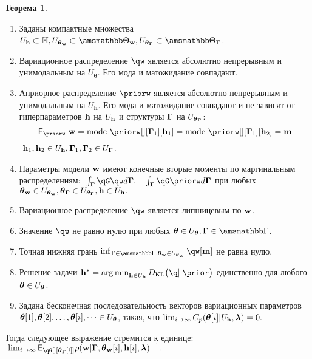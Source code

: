 \documentclass[11pt, a5paper]{dissert}
\theoremstyle{definition}
\newtheorem{theorem}{Теорема}
\DeclareMathOperator*{\argmin}{arg\,min}
\begin{document}
{\begin{theorem}
\begin{enumerate}
\item Заданы компактные множества $\Uh \subset \Hb, \Utetaw \subset \Tetawb, \UtetaG \subset \TetaGb$.

\item Вариационное распределение $\qw$  является абсолютно непрерывным и унимодальным на  $U_{\boldsymbol{\theta}}$.
Его мода и матожидание совпадают.




\item Априорное распределение $\priorw$ является абсолютно непрерывным и унимодальным на  $U_\mathbf{h}$. Его мода и матожидание совпадают и не зависят от гиперпараметров $\mathbf{h}$  на $U_{\mathbf{h}}$ и структуры $\boldsymbol{\Gamma}$ на $U_{\boldsymbol{\theta}_{\boldsymbol{\Gamma}}}$:
\[
\E_{\priorw}~\w = \text{mode}~\priorw[][\G_1][\h_1]=\text{mode}~\priorw[][\G_1][\h_2]=\mathbf{m}
\]
$~\mathbf{h}_1,\mathbf{h}_2 \in U_{\mathbf{h}}, \boldsymbol{\Gamma}_1,\boldsymbol{\Gamma}_2 \in U_{\boldsymbol{\Gamma}}$.


\item Параметры модели $\mathbf{w}$ имеют конечные вторые моменты по маргинальным распределениям:
$
   \int_{\G}\qG\qw d\G, \quad \int_{\G}\qG\priorw d\G
$
при любых $\boldsymbol{\theta}_\mathbf{w} \in U_{\boldsymbol{\theta}_\mathbf{w}}, \boldsymbol{\theta}_{\boldsymbol{\Gamma}} \in U_{\boldsymbol{\theta}_{\boldsymbol{\Gamma}}}, \mathbf{h} \in U_{\mathbf{h}}.$


\item Вариационное распределение $\qw$ является липшицевым по $\mathbf{w}$.

\item Значение $\qw$ не равно нулю при любых $\teta \in \Uteta, \G \in \Gb$.

\item Точная нижняя грань $\inf_{\G \in \Gb, \tetaw \in \Utetaw} \qw[\mathbf{m}]$ не равна нулю.


\item Решение задачи $
\h^{*} = \argmin_{\h \in \Uh} \KL{\q}{\prior}$ единственно для любого $\boldsymbol{\theta} \in U_{\boldsymbol{\theta}}$.



\item Задана бесконечная последовательность векторов вариационных параметров $\boldsymbol{\theta}[1],\boldsymbol{\theta}[2],\dots,\boldsymbol{\theta}[i],\dots \in U_{\boldsymbol{\theta}}$, такая, что $\lim_{i \to \infty}C_p(\boldsymbol{\theta}[i]|U_{\mathbf{h}},\boldsymbol{\lambda}) = 0.$
\end{enumerate}
Тогда следующее выражение стремится к единице:
$
   \lim_{i \to \infty} \E_{\qG[][{\tetaG[i]}]} {\rho}(\w|\G, {\tetaw[i]}, {\h[i]}, \lam)^{-1}.
$

\end{theorem}

}
\end{document}

